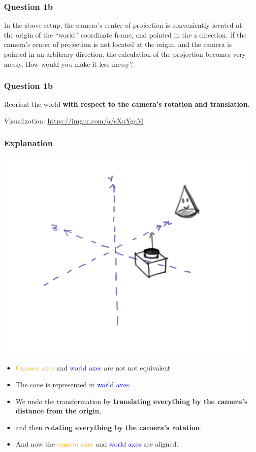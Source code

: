 \documentclass{beamer}
\begin{document}
\begin{frame}
    \frametitle{Question 1b}
    In the above setup, the camera's center of projection is conveniently located at the origin of the “world” coordinate frame, 
    and pointed in the z direction. If the camera's center of projection is not located at the origin, and the camera is pointed in an 
    arbitrary direction, the calculation of the projection becomes very messy. How would you make it less messy?
\end{frame}

\begin{frame}
    \frametitle{Question 1b}

    Reorient the world \textbf{with respect to the camera's rotation and translation}.

    \vspace{1em}

    Visualization: \url{https://imgur.com/a/sXuYgaM}
    
\end{frame}

\begin{frame}
    \frametitle{Explanation}

    \begin{center}
        \includegraphics[]{q1b-orig.png}
    \end{center}

    \small
    \begin{itemize}
        \item \textcolor{orange}{Camera axes} and \textcolor{blue}{world axes} are not not equivalent
        \item The cone is represented in \textcolor{blue}{world axes}.
        \item We undo the transformation by \textbf{translating everything by the camera's distance from the origin},
        \item and then \textbf{rotating everything by the camera's rotation}.
        \item And now the \textcolor{orange}{camera axes} and \textcolor{blue}{world axes} are aligned.
    \end{itemize}

\end{frame}
\end{document}
